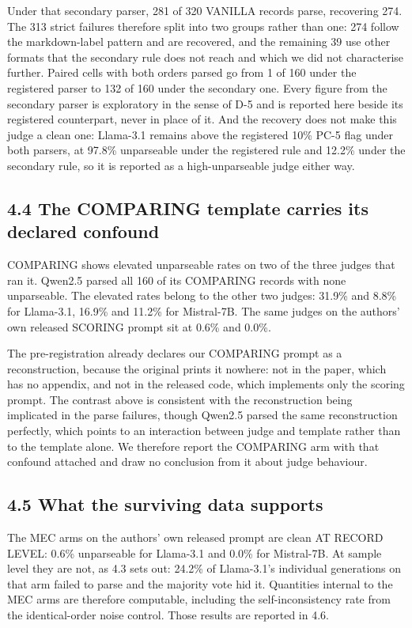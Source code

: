 Under that secondary parser, 281 of 320 VANILLA records parse, recovering 274. The 313 strict
failures therefore split into two groups rather than one: 274 follow the markdown-label pattern and
are recovered, and the remaining 39 use other formats that the secondary rule does not reach and
which we did not characterise further. Paired cells with
both orders parsed go from 1 of 160 under the registered parser to 132 of 160 under the secondary
one. Every figure from the secondary parser is exploratory in the sense of D-5 and is reported here
beside its registered counterpart, never in place of it. And the recovery does not make this judge
a clean one: Llama-3.1 remains above the registered 10\% PC-5 flag under both parsers, at 97.8\%
unparseable under the registered rule and 12.2\% under the secondary rule, so it is reported as a
high-unparseable judge either way.

\subsection{4.4 The COMPARING template carries its declared confound}\label{the-comparing-template-carries-its-declared-confound}

COMPARING shows elevated unparseable rates on two of the three judges that ran it. Qwen2.5 parsed all 160 of its COMPARING records with none unparseable. The elevated rates belong to
the other two judges: 31.9\% and 8.8\% for
Llama-3.1, 16.9\% and 11.2\% for Mistral-7B. The same judges on the authors' own released SCORING
prompt sit at 0.6\% and 0.0\%.

The pre-registration already declares our COMPARING prompt as a reconstruction, because the
original prints it nowhere: not in the paper, which has no appendix, and not in the released code,
which implements only the scoring prompt. The contrast above is consistent with the reconstruction
being implicated in the parse failures, though Qwen2.5 parsed the same reconstruction perfectly, which
points to an interaction between judge and template rather than to the template alone. We therefore report the COMPARING
arm with that confound attached and draw no conclusion from it about judge behaviour.

\subsection{4.5 What the surviving data supports}\label{what-the-surviving-data-supports}

The MEC arms on the authors' own released prompt are clean AT RECORD LEVEL: 0.6\% unparseable for
Llama-3.1 and 0.0\% for Mistral-7B. At sample level they are not, as 4.3 sets out: 24.2\% of
Llama-3.1's individual generations on that arm failed to parse and the majority vote hid it. Quantities internal to the MEC arms are therefore computable, including the
self-inconsistency rate from the identical-order noise control. Those results are reported in 4.6.

